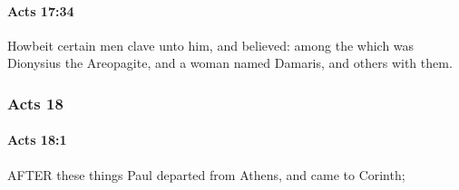 		\paragraph{Acts 17:34} %
			\label{ACTS-17-34}

			Howbeit certain men clave unto him, and believed: among the which was Dionysius the Areopagite, and a woman named Damaris, and others with them.

			\begin{framed}
			\scriptsize
				\begin{compactdesc}
					\item[SBLG] 
				\end{compactdesc}
			\end{framed}

	\subsubsection{Acts 18} %
		\label{ACTS-18}
		
		\paragraph{Acts 18:1} %
			\label{ACTS-18-1}

			AFTER these things Paul departed from Athens, and came to Corinth;

